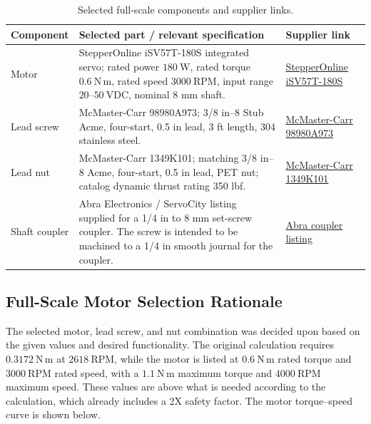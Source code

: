 \documentclass[11pt]{article}
\begin{document}
\begin{table}[h!]
\centering
\begin{tabularx}{\textwidth}{@{}l Y Y@{}}
\toprule
\textbf{Component} & \textbf{Selected part / relevant specification} & \textbf{Supplier link} \\
\midrule
Motor & StepperOnline iSV57T-180S integrated servo; rated power $180\ \mathrm{W}$, rated torque $0.6\ \mathrm{N\,m}$, rated speed $3000\ \mathrm{RPM}$, input range $20$--$50\ \mathrm{VDC}$, nominal 8 mm shaft. & \href{https://www.stepperonline.ca/nema-23-integrated-easy-servo-motor-180w-3000rpm-0-6nm-84-98oz-in-20-50vdc-servo-motor-short-shaft-isv57t-180s.html}{StepperOnline iSV57T-180S} \\
\addlinespace
Lead screw & McMaster-Carr 98980A973; 3/8 in--8 Stub Acme, four-start, 0.5 in lead, 3 ft length, 304 stainless steel. & \href{https://www.mcmaster.com/98980A973/}{McMaster-Carr 98980A973} \\
\addlinespace
Lead nut & McMaster-Carr 1349K101; matching 3/8 in--8 Acme, four-start, 0.5 in lead, PET nut; catalog dynamic thrust rating 350 lbf. & \href{https://www.mcmaster.com/1349K101/}{McMaster-Carr 1349K101} \\
\addlinespace
Shaft coupler & Abra Electronics / ServoCity listing supplied for a 1/4 in to 8 mm set-screw coupler. The screw is intended to be machined to a 1/4 in smooth journal for the coupler. & \href{https://abra-electronics.com/robotics-actobotics-servocity/motion-en/couplers/set-screw-shaft-couplers/625182-1-4-to-8mm-set-screw-shaft-coupler-actobotics-clone.html}{Abra coupler listing} \\
\bottomrule
\end{tabularx}
\caption{Selected full-scale components and supplier links.}
\end{table}

\newpage

\subsection{Full-Scale Motor Selection Rationale}

The selected motor, lead screw, and nut combination was decided upon based
on the given values and desired functionality. The original calculation
requires $0.3172\ \mathrm{N\,m}$ at $2618\ \mathrm{RPM}$, while the motor is
listed at $0.6\ \mathrm{N\,m}$ rated torque and $3000\ \mathrm{RPM}$ rated
speed, with a $1.1\ \mathrm{N\,m}$ maximum torque and $4000\ \mathrm{RPM}$
maximum speed. These values are above what is needed according to the
calculation, which already includes a 2X safety factor. The motor torque--speed
curve is shown below.
\end{document}
